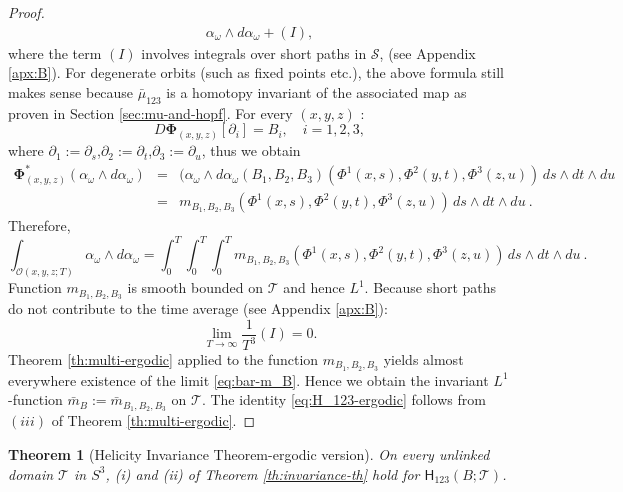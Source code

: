 \documentclass[12pt]{article}
\numberwithin{equation}{section}
\newtheorem{theorem}{Theorem}[section]
\begin{document}
\begin{proof}
\begin{eqnarray*}
\alpha_\omega\wedge d\alpha_\omega+(I),
\end{eqnarray*}
where the term $(I)$ involves integrals over short paths in $\mathcal{S}$, (see Appendix \ref{apx:B}).
For degenerate orbits (such as fixed points etc.), the above formula still makes sense because $\bar{\mu}_{123}$ is a homotopy invariant of the associated map as proven in Section \ref{sec:mu-and-hopf}.
For every $(x,y,z)$ : 
\[
 D\mathbf{\Phi}_{(x,y,z)}[\partial_i]=B_i,\quad i=1,2,3,
\] 
where $\partial_1:=\partial_s$,$\partial_2:=\partial_t$,$\partial_3:=\partial_u$, thus we obtain
\begin{eqnarray*}
 \mathbf{\Phi}^\ast_{(x,y,z)}(\alpha_\omega\wedge d\alpha_\omega) & = & (\alpha_\omega\wedge d\alpha_\omega(B_1,B_2,B_3)(\Phi^1(x,s),\Phi^2(y,t),\Phi^3(z,u))\,ds\wedge dt\wedge du\\
 & = & m_{B_1,B_2,B_3}(\Phi^1(x,s),\Phi^2(y,t),\Phi^3(z,u))\,ds\wedge dt\wedge du\ .
\end{eqnarray*}
Therefore, 
\[
\int_{\mathscr{O}(x,y,z;T)}
\alpha_\omega\wedge d\alpha_\omega=\int^T_0\int^T_0\int^T_0 m_{B_1,B_2,B_3}(\Phi^1(x,s),\Phi^2(y,t),\Phi^3(z,u))\,ds\wedge dt\wedge du\ .
\]
Function $m_{B_1,B_2,B_3}$ is smooth bounded on $\mathcal{T}$ and hence $L^1$. Because short paths do not contribute to the time average (see Appendix \ref{apx:B}):
\[
 \lim_{T\to\infty} \frac{1}{T^3}(I)=0.
\]
Theorem \ref{th:multi-ergodic} applied to the function $m_{B_1,B_2,B_3}$ yields almost everywhere existence of the limit \eqref{eq:bar-m_B}. Hence we obtain the invariant $L^1$-function $\bar{m}_B:=\bar{m}_{B_1,B_2,B_3}$ on $\mathcal{T}$. The identity \eqref{eq:H_123-ergodic} 
follows from $(iii)$ of Theorem \ref{th:multi-ergodic}.
\end{proof}

\begin{theorem}[Helicity Invariance Theorem-ergodic version]\label{th:invariance-th-ergodic}
 On every unlinked domain $\mathcal{T}$ in $S^3$, (i) and (ii) of Theorem 
 \ref{th:invariance-th} hold for $\mathsf{H}_{123}(B;\mathcal{T})$.
 \end{theorem}
\end{document}
